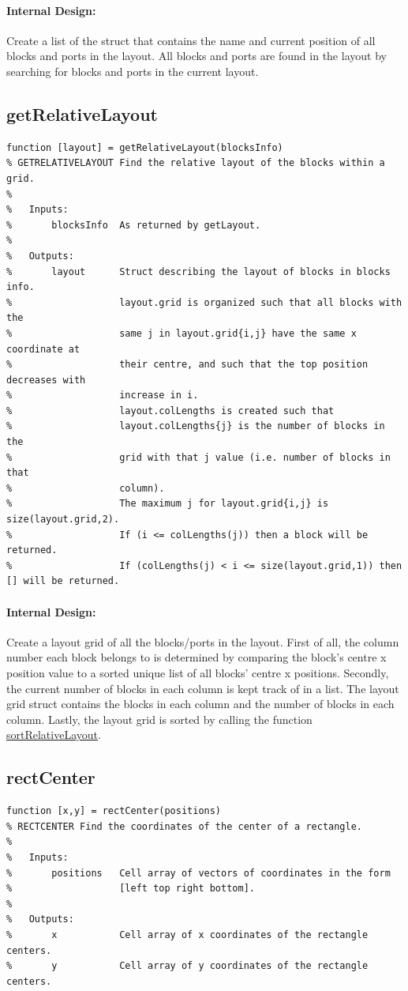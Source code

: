 \documentclass[12pt,letterpaper]{report}
\begin{document}
\paragraph{Internal Design:} Create a list of the struct that contains the name and current position of all blocks and ports in the layout. All blocks and ports are found in the layout by searching for blocks and ports in the current layout.

\subsection{getRelativeLayout}
\begin{lstlisting}
function [layout] = getRelativeLayout(blocksInfo)
% GETRELATIVELAYOUT Find the relative layout of the blocks within a grid.
%
%   Inputs:
%       blocksInfo  As returned by getLayout.
%
%   Outputs:
%       layout      Struct describing the layout of blocks in blocks info.
%                   layout.grid is organized such that all blocks with the
%                   same j in layout.grid{i,j} have the same x coordinate at
%                   their centre, and such that the top position decreases with
%                   increase in i.
%                   layout.colLengths is created such that
%                   layout.colLengths{j} is the number of blocks in the
%                   grid with that j value (i.e. number of blocks in that
%                   column).
%                   The maximum j for layout.grid{i,j} is size(layout.grid,2).
%                   If (i <= colLengths(j)) then a block will be returned.
%                   If (colLengths(j) < i <= size(layout.grid,1)) then [] will be returned.
\end{lstlisting}
\paragraph{Internal Design:} Create a layout grid of all the blocks/ports in the layout. First of all, the column number each block belongs to is determined by comparing the block's centre x position value to a sorted unique list of all blocks' centre x positions. Secondly, the current number of blocks in each column is kept track of in a list. The layout grid struct contains the blocks in each column and the number of blocks in each column. Lastly, the layout grid is sorted by calling the function \hyperref[sortRelativeLayout]{sortRelativeLayout}.

\subsection{rectCenter}
\begin{lstlisting}
function [x,y] = rectCenter(positions)
% RECTCENTER Find the coordinates of the center of a rectangle.
%
%   Inputs:
%       positions   Cell array of vectors of coordinates in the form
%                   [left top right bottom].
%
%   Outputs:
%       x           Cell array of x coordinates of the rectangle centers.
%       y           Cell array of y coordinates of the rectangle centers.
\end{lstlisting}
\end{document}
